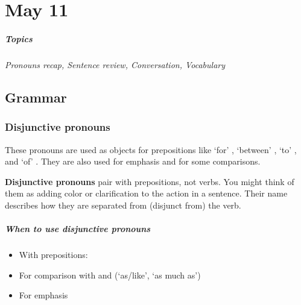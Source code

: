 \chapter{May 11}
\paragraph{Topics}
\textit{Pronouns recap, Sentence review, Conversation, Vocabulary}

\section{Grammar} \label{0511-Grammar}
\subsection{Disjunctive pronouns}
These pronouns are used as objects for prepositions like `for' , `between' ,
`to' , and `of' . They are also used for emphasis and for some comparisons.
\begin{mdframed}
  \textbf{Disjunctive pronouns} pair with prepositions, not verbs. You might think of them as
  adding color or clarification to the action in a sentence. Their name describes how they
  are separated from (disjunct from) the verb.
\end{mdframed}

\paragraph{When to use disjunctive pronouns}
\begin{itemize}
    \item{With prepositions: }
    \item{For comparison with  and  (`as/like', `as much as')}
    \item{For emphasis}
\end{itemize}

